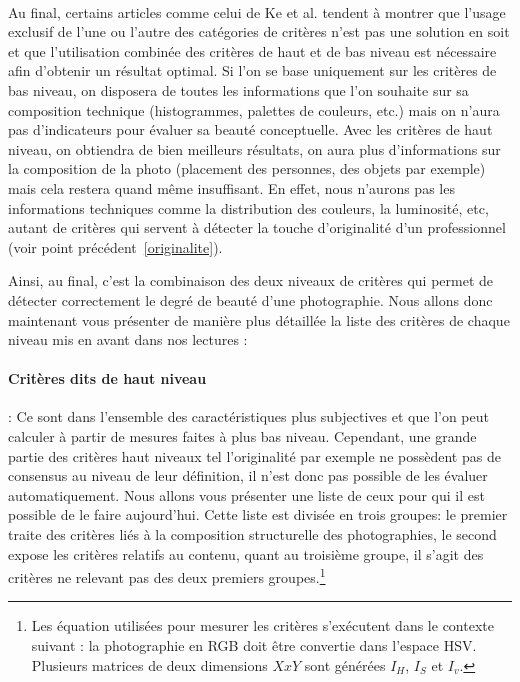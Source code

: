 \documentclass[11pt, french,screen]{report-rd-info}
\begin{document}
\paragraph*{}
Au final, certains articles comme celui de Ke et al. tendent à montrer que l'usage exclusif de l'une ou l'autre des catégories de critères n’est pas une solution en soit et que l’utilisation combinée des critères de haut et de bas niveau est nécessaire afin d’obtenir un résultat optimal. Si l’on se base uniquement sur les critères de bas niveau, on disposera de toutes les informations que l’on souhaite sur sa composition technique (histogrammes, palettes de couleurs, etc.) mais on n’aura pas d’indicateurs pour évaluer sa beauté conceptuelle. Avec les critères de haut niveau, on obtiendra de bien meilleurs résultats, on aura plus d’informations sur la composition de la photo (placement des personnes, des objets par exemple) mais cela restera quand même insuffisant. En effet, nous n’aurons pas les informations techniques comme la distribution des couleurs, la luminosité, etc, autant de critères qui servent à détecter la touche d’originalité d’un professionnel (voir point précédent~\ref{originalite}).

Ainsi, au final, c’est la combinaison des deux niveaux de critères qui permet de détecter correctement le degré de beauté d’une photographie.
Nous allons donc maintenant vous présenter de manière plus détaillée la liste des critères de chaque niveau mis en avant dans nos lectures :
\paragraph{Critères dits de haut niveau} : Ce sont dans l'ensemble des caractéristiques plus subjectives et que l'on peut calculer à partir de mesures faites à plus bas niveau. Cependant, une grande partie des critères haut niveaux tel l’originalité par exemple ne possèdent pas de consensus au niveau de leur définition, il n’est donc pas possible de les évaluer automatiquement. Nous allons vous présenter une liste de ceux pour qui il est possible de le faire aujourd'hui. Cette liste est divisée en trois groupes: le premier traite des critères liés à la composition structurelle des photographies, le second expose les critères relatifs au contenu, quant au troisième groupe, il s'agit des critères ne relevant pas des deux premiers groupes.\footnote{Les équation utilisées pour mesurer les critères s'exécutent dans le contexte suivant : la photographie en RGB doit être convertie dans l'espace HSV. Plusieurs matrices de deux dimensions $X x Y$ sont générées $I_H$, $I_S$ et $I_v$.}
\end{document}
